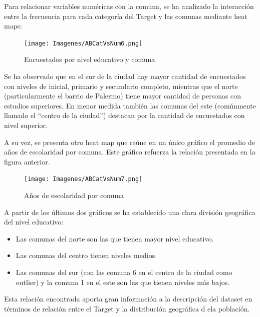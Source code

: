 \documentclass[a4paper]{article}
\begin{document}
            Para relacionar variables numéricas con la comuna, se ha analizado la interacción entre la frecuencia para cada categoría del Target y las comunas mediante heat maps: 
 
            \begin{figure}[H]
            \centering
                \texttt{[image: Imagenes/ABCatVsNum6.png]}
                \caption{Encuestados por nivel educativo y comuna}
                \label{AB education level and location}
            \end{figure}
 
            Se ha observado que en el sur de la ciudad hay  mayor cantidad de encuestados con niveles de inicial, primario y secundario completo, mientras que el norte (particularmente el barrio de Palermo) tiene mayor cantidad de personas con estudios superiores. En menor medida también las comunas del este (comúnmente llamado el ``centro de la ciudad'') destacan por la cantidad de encuestados con nivel superior.

\vspace{1cm}
            A su vez, se presenta otro heat map que reúne en un único gráfico el promedio de años de escolaridad por comuna. Este gráfico refuerza la relación presentada en la figura anterior.

            \begin{figure}[H]
            \centering
                \texttt{[image: Imagenes/ABCatVsNum7.png]}
                \caption{Años de escolaridad por comuna}
                \label{AB years of education and location}
            \end{figure}
 
            A partir de los últimos dos gráficos se ha establecido una clara división geográfica del nivel educativo:
            \begin{itemize}
                \item Las comunas del norte son las que tienen mayor nivel educativo.
                \item Las comunas del centro tienen niveles medios.
                \item Las comunas del sur (con las comuna 6 en el centro de la ciudad como outlier) y la comuna 1 en el este son las que tienen niveles más bajos.
            \end{itemize}

            Esta relación encontrada aporta gran información a la descripción del dataset en términos de relación entre el Target y la distribución geográfica d ela población.
    
\end{document}
